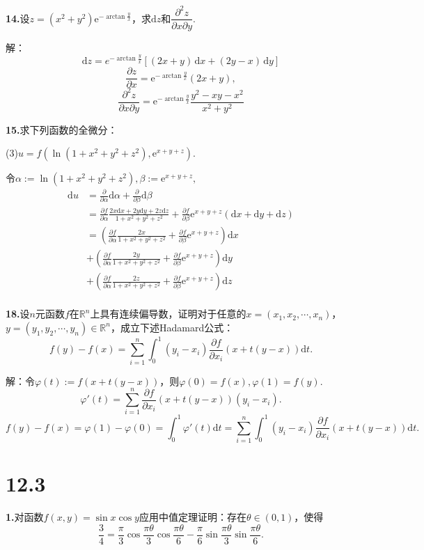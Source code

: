 \documentclass[12pt, a4paper]{article}
\newcommand{\RR}{\mathbb{R}}
\newcommand{\e}{\mathrm{e}}
\newcommand{\dif}{\mathrm{d}}
\begin{document}
\textbf{14.}设\(z = (x^2 + y^2)\e^{-\arctan\frac{y}{x}}\)，求\(\dif z\)和\(\dfrac{\partial^2 z}{\partial x \partial y}\).

解：
\[\dif z = e^{-\arctan\frac{y}{x}} \left[ (2x + y)\,\dif x + (2y - x)\,\dif y \right]\]
\[\frac{\partial z}{\partial x} = \e^{-\arctan\frac{y}{x}} (2x + y),\]
\[\frac{\partial^{2}z}{\partial x\partial y} = \e^{-\arctan\frac{y}{x}}\frac{y^{2} - xy - x^2}{x^{2} + y^{2}}\]

\textbf{15.}求下列函数的全微分：

(3)\(u = f\left(\ln(1 + x^2 + y^2 + z^2), \e^{x + y + z}\right)\).

令\(\alpha := \ln(1 + x^2 + y^2 + z^2), \beta := \e^{x + y + z},\)
\begin{align*}
\dif u &= \frac{\partial}{\partial \alpha}\dif \alpha + \frac{\partial}{\partial \beta}\dif \beta \\
&= \frac{\partial f}{\partial \alpha} \frac{2x \dif x + 2y \dif y + 2z \dif z}{1 + x^2 + y^2 + z^2} + \frac{\partial f}{\partial \beta} \e^{x + y + z}(\dif x + \dif y + \dif z) \\
&= \left(\frac{\partial f}{\partial \alpha} \frac{2x}{1 + x^2 + y^2 + z^2} + \frac{\partial f}{\partial \beta} \e^{x + y + z}\right) \dif x \\
&+ \left(\frac{\partial f}{\partial \alpha} \frac{2y}{1 + x^2 + y^2 + z^2} + \frac{\partial f}{\partial \beta} \e^{x + y + z}\right) \dif y \\
&+ \left(\frac{\partial f}{\partial \alpha} \frac{2z}{1 + x^2 + y^2 + z^2} + \frac{\partial f}{\partial \beta} \e^{x + y + z}\right) \dif z \\
\end{align*}

\textbf{18.}设\(n\)元函数\(f\)在\(\RR^n\)上具有连续偏导数，证明对于任意的\(x = (x_1, x_2, \cdots, x_n)\)，\(y = (y_1, y_2, \cdots, y_n) \in \RR^n\)，成立下述Hadamard公式：
\[f(y) - f(x) = \sum_{i = 1}^{n} \int_{0}^{1} (y_i - x_i) \frac{\partial f}{\partial x_i}(x + t(y - x)) \dif t.\]

解：令\(\varphi(t) := f(x + t(y - x))\)，则\(\varphi(0) = f(x), \varphi(1) = f(y)\).
\[\varphi'(t) = \sum_{i = 1}^{n} \frac{\partial f}{\partial x_i}(x + t(y - x)) (y_i - x_i).\]
\[f(y) - f(x) = \varphi(1) - \varphi(0) = \int_{0}^{1} \varphi'(t) \dif t = \sum_{i = 1}^{n} \int_{0}^{1} (y_i - x_i) \frac{\partial f}{\partial x_i}(x + t(y - x)) \dif t.\]

\section*{12.3}
\textbf{1.}对函数\(f(x, y) = \sin x \cos y\)应用中值定理证明：存在\(\theta \in (0, 1)\)，使得
\[\frac{3}{4} = \frac{\pi}{3}\cos\frac{\pi\theta}{3}\cos\frac{\pi\theta}{6} - \frac{\pi}{6}\sin\frac{\pi\theta}{3}\sin\frac{\pi\theta}{6}.\]
\end{document}

